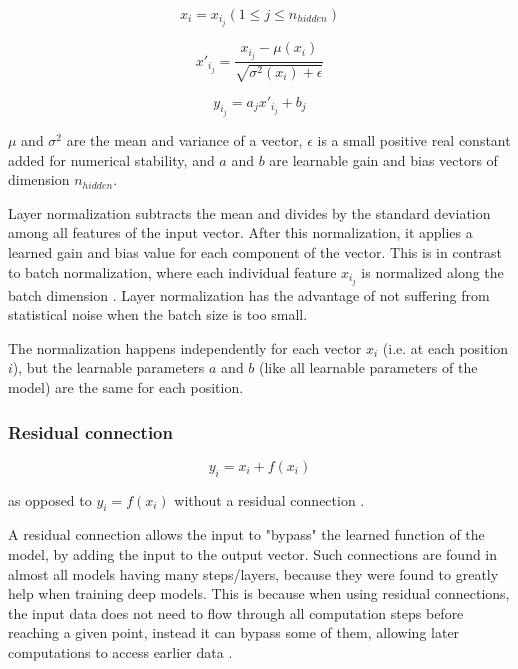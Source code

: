 
$$x_i = x_{i_j} (1 \leq j \leq n_{hidden})$$

$$x'_{i_j} = \frac {x_{i_j} - \mu(x_i)} {\sqrt {\sigma^2(x_i)+\epsilon}} $$

$$y_{i_j} = a_j x'_{i_j} + b_j$$

$\mu$ and $\sigma^2$ are the mean and variance of a vector, $\epsilon$ is a small positive real constant added for numerical stability, and $a$ and $b$ are learnable gain and bias vectors of dimension $n_{hidden}$.

Layer normalization subtracts the mean and divides by the standard deviation among all features of the input vector.
After this normalization, it applies a learned gain and bias value for each component of the vector.
This is in contrast to batch normalization, where each individual feature $x_{i_j}$ is normalized along the batch dimension .
Layer normalization has the advantage of not suffering from statistical noise when the batch size is too small.

The normalization happens independently for each vector $x_i$ (i.e. at each position $i$), but the learnable parameters $a$ and $b$ (like all learnable parameters of the model) are the same for each position.

\subsubsection{Residual connection}

\begin{samepage}

$$y_i = x_i + f(x_i)$$

as opposed to $y_i = f(x_i)$ without a residual connection \cite[p. 3]{allyouneed} \cite{residual}.

A residual connection allows the input to "bypass" the learned function of the model, by adding the input to the output vector.
Such connections are found in almost all models having many steps/layers, because they were found to greatly help when training deep models.
This is because when using residual connections, the input data does not need to flow through all computation steps before reaching a given point, instead it can bypass some of them, allowing later computations to access earlier data .

\end{samepage}

